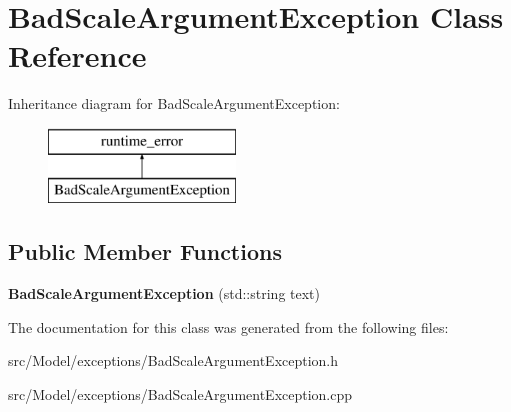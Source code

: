\hypertarget{classBadScaleArgumentException}{}\section{Bad\+Scale\+Argument\+Exception Class Reference}
\label{classBadScaleArgumentException}
Inheritance diagram for Bad\+Scale\+Argument\+Exception\+:\begin{figure}[H]
\begin{center}
\leavevmode
\includegraphics[height=2.000000cm]{classBadScaleArgumentException}
\end{center}
\end{figure}
\subsection*{Public Member Functions}
\begin{DoxyCompactItemize}
\item 
{\bfseries Bad\+Scale\+Argument\+Exception} (std\+::string text)\hypertarget{classBadScaleArgumentException_af354922bab2495deac08106e5d28e094}{}\label{classBadScaleArgumentException_af354922bab2495deac08106e5d28e094}

\end{DoxyCompactItemize}


The documentation for this class was generated from the following files\+:\begin{DoxyCompactItemize}
\item 
src/\+Model/exceptions/Bad\+Scale\+Argument\+Exception.\+h\item 
src/\+Model/exceptions/Bad\+Scale\+Argument\+Exception.\+cpp\end{DoxyCompactItemize}
